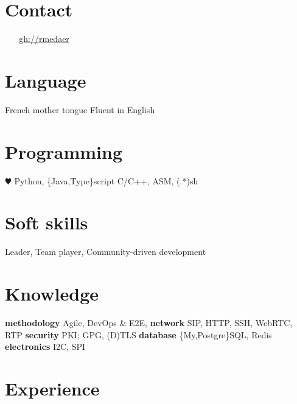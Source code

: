 \documentclass[]{friggeri-cv} %
\begin{document}




\begin{aside} %
\section{Contact}
\myAddress
~
\myPhoneNumber
~
\href{mailto:\myPrivateMail}{\ul{\myPrivateMail}}
\href{http://github.com/rmedaer}{\ul{gh://rmedaer}}
\section{Language}
French mother tongue
Fluent in English
\section{Programming}
{\color{red} $\varheartsuit$} Python, \{Java,Type\}script
C/C++, ASM, (.*)sh
\section{Soft skills}
Leader,
Team player,
Community-driven development
\section{Knowledge}
\textbf{methodology}
Agile, DevOps \& E2E,
\textbf{network}
SIP, HTTP, SSH, WebRTC, RTP
\textbf{security}
PKI; GPG, (D)TLS
\textbf{database}
\{My,Postgre\}SQL, Redis
\textbf{electronics}
I2C, SPI
\end{aside}


\section{Experience}
\end{document}
